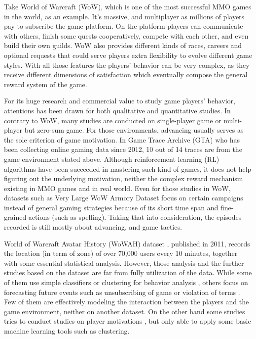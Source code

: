 \documentclass{sigchi}
\begin{document}
Take World of Warcraft (WoW), which is one of the most successful MMO games in the world, as an example.
It's massive, and multiplayer as millions of players pay to subscribe the game platform.
On the platform players can communicate with others, finish some quests cooperatively, compete with each other, and even build their own guilds.
WoW also provides different kinds of races, careers and optional requests that could serve players extra flexibility to evolve different game styles.
With all those features the players' behavior can be very complex, as they receive different dimensions of satisfaction which eventually compose the general reward system of the game.

For its huge research and commercial value to study game players' behavior, attentions has been drawn for both qualitative and quantitative studies.
In contrary to WoW, many studies are conducted on single-player game or multi-player but zero-sum game.
For those environments, advancing usually serves as the sole criterion of game motivation.
In Game Trace Archive (GTA) \cite{guo2012game} who has been collecting online gaming data since 2012, 10 out of 14 traces are from the game environment stated above.
Although reinforcement learning (RL) algorithms have been succeeded in mastering such kind of games, it does not help figuring out the underlying motivation, neither the complex reward mechanism existing in MMO games and in real world.
Even for those studies in WoW, datasets such as Very Large WoW Armory Dataset \cite{Bell2013a} focus on certain campaigns instead of general gaming strategies because of its short time span and fine-grained actions (such as spelling).
Taking that into consideration, the episodes recorded is still mostly about advancing, and game tactics.

World of Warcraft Avatar History (WoWAH) dataset \cite{lee2011world}, published in 2011, records the location (in term of zone) of over 70,000 users every 10 minutes, together with some essential statistical analysis.
However, those analysis and the further studies based on the dataset are far from fully utilization of the data.
While some of them use simple classifiers or clustering for behavior analysis \cite{suznjevic2011mmorpg,drachen2014comparison}, others focus on forecasting future events such as unsubscribing of game or violation of terms \cite{bauckhage2015clustering,thawonmas2011analysis,lou2012forecasting}.
Few of them are effectively modeling the interaction between the players and the game environment, neither on another dataset. 
On the other hand some studies tries to conduct studies on player motivations \cite{Bell2013a}, but only able to apply some basic machine learning tools such as clustering.
\end{document}
